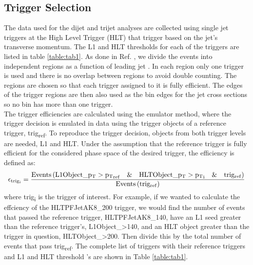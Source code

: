 \subsection{Trigger Selection}
The data used for the dijet and trijet analyses are collected using single jet triggers at the High Level Trigger (HLT) that trigger based on the jet's transverse momentum. The L1 and HLT thresholds for each of the triggers are listed in table \ref{table:tab1}. As done in Ref. \cite{1605_IncJet}, we divide the events into independent regions as a function of leading jet \pt. In each region only one trigger is used and there is no overlap between regions to avoid double counting. The regions are chosen so that each trigger assigned to it is fully efficient. The edges of the trigger regions are then also used as the \pt bin edges for the jet cross sections so no \pt bin has more than one trigger.\\
The trigger efficiencies are calculated using the emulator method, where the trigger decision is emulated in data using the trigger objects of a reference trigger, trig\textsubscript{ref}. To reproduce the trigger decision, objects from both trigger levels are needed, L1 and HLT. Under the assumption that the reference trigger is fully efficient for the considered phase space of the desired trigger, the efficiency is defined as:
\begin{equation}\label{eq:1}
\epsilon_{{\rm trig_i}}=\frac{\rm Events\left({\rm L1Object}\_{p_{\mathrm{T}}}>{p_{\mathrm{T}}}_{{\rm ref}}\quad \& \quad {\rm HLTObject\_{\ensuremath{p_{\mathrm{T}}}}>{\ensuremath{p_{\mathrm{T}}}}_i \quad\&\quad trig_{ref}} \right)} { \rm Events \left( trig_{ref} \right) }
\end{equation}
where trig\textsubscript{i} is the trigger of interest. For example, if we wanted to calculate the effciency of the HLTPFJetAK8\_200 trigger, we would find the number of events that passed the reference trigger, HLTPFJetAK8\_140, have an L1 seed \pt greater than the reference trigger's, L1Object\_\pt\textgreater140, and an HLT object \pt greater than the trigger in question, HLTObject\_\pt\textgreater200. Then divide this by the total number of events that pass trig\textsubscript{ref}. The complete list of triggers with their reference triggers and L1 and HLT threshold \pt's are shown in Table \ref{table:tab1}.\\
